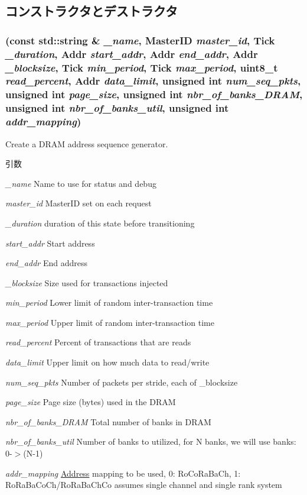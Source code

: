 \subsection{コンストラクタとデストラクタ}
\hypertarget{classDramGen_afc7f569fe1b2004371d6c159a9bdcba7}{
\subsubsection[{DramGen}]{ (const std::string \& {\em \_\-name}, \/  {\bf MasterID} {\em master\_\-id}, \/  {\bf Tick} {\em \_\-duration}, \/  {\bf Addr} {\em start\_\-addr}, \/  {\bf Addr} {\em end\_\-addr}, \/  {\bf Addr} {\em \_\-blocksize}, \/  {\bf Tick} {\em min\_\-period}, \/  {\bf Tick} {\em max\_\-period}, \/  uint8\_\-t {\em read\_\-percent}, \/  {\bf Addr} {\em data\_\-limit}, \/  unsigned int {\em num\_\-seq\_\-pkts}, \/  unsigned int {\em page\_\-size}, \/  unsigned int {\em nbr\_\-of\_\-banks\_\-DRAM}, \/  unsigned int {\em nbr\_\-of\_\-banks\_\-util}, \/  unsigned int {\em addr\_\-mapping})}}
\label{classDramGen_afc7f569fe1b2004371d6c159a9bdcba7}
Create a DRAM address sequence generator.


\begin{DoxyParams}{引数}
\item[{\em \_\-name}]Name to use for status and debug \item[{\em master\_\-id}]MasterID set on each request \item[{\em \_\-duration}]duration of this state before transitioning \item[{\em start\_\-addr}]Start address \item[{\em end\_\-addr}]End address \item[{\em \_\-blocksize}]Size used for transactions injected \item[{\em min\_\-period}]Lower limit of random inter-\/transaction time \item[{\em max\_\-period}]Upper limit of random inter-\/transaction time \item[{\em read\_\-percent}]Percent of transactions that are reads \item[{\em data\_\-limit}]Upper limit on how much data to read/write \item[{\em num\_\-seq\_\-pkts}]Number of packets per stride, each of \_\-blocksize \item[{\em page\_\-size}]Page size (bytes) used in the DRAM \item[{\em nbr\_\-of\_\-banks\_\-DRAM}]Total number of banks in DRAM \item[{\em nbr\_\-of\_\-banks\_\-util}]Number of banks to utilized, for N banks, we will use banks: 0-\/$>$(N-\/1) \item[{\em addr\_\-mapping}]\hyperlink{classAddress}{Address} mapping to be used, 0: RoCoRaBaCh, 1: RoRaBaCoCh/RoRaBaChCo assumes single channel and single rank system \end{DoxyParams}



